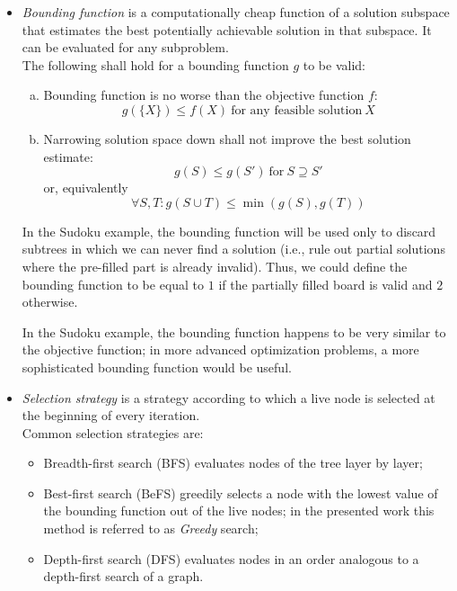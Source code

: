 \begin{itemize}
    \item \emph{Bounding function} is a computationally cheap function of a solution subspace
        that estimates the best potentially achievable solution in that subspace.
        It can be evaluated for any subproblem. \\
        The following shall hold for a bounding function $g$ to be valid:
        \begin{enumerate}[(a)]
            \item Bounding function is no worse than the objective function $f$:
                \[
                g(\{X\}) \leq f(X) \:\text{for any feasible solution}\: X
                \]
            \item Narrowing solution space down shall not improve the best solution estimate:
                \[
                g(S) \leq g(S') \:\text{for}\: S \supseteq S'
                \]
                or, equivalently
                \[
                \forall S, T: g(S \cup T) \leq \min(g(S), g(T))
                \]
        \end{enumerate}

        In the Sudoku example, the bounding function will be used only to discard subtrees
        in which we can never find a solution (i.e., rule out partial solutions where the
        pre-filled part is already invalid). Thus, we could define
        the bounding function to be equal to $1$ if the partially filled board is valid and $2$
        otherwise.

        In the Sudoku example, the bounding function happens to be very similar to the objective
        function; in more advanced optimization problems, a more sophisticated bounding
        function would be useful.

    \item \emph{Selection strategy} is a strategy according to which a live node is selected
        at the beginning of every iteration. \\
        Common selection strategies are:
        \begin{itemize}
            \item Breadth-first search (BFS) evaluates nodes of the tree layer by layer;
            \item Best-first search (BeFS) greedily selects a node with the lowest value of the
                bounding function out of the live nodes; in the presented work this method
                is referred to as \emph{Greedy} search;
            \item Depth-first search (DFS) evaluates nodes in an order analogous to a
                depth-first search of a graph.
        \end{itemize}


\end{itemize}
